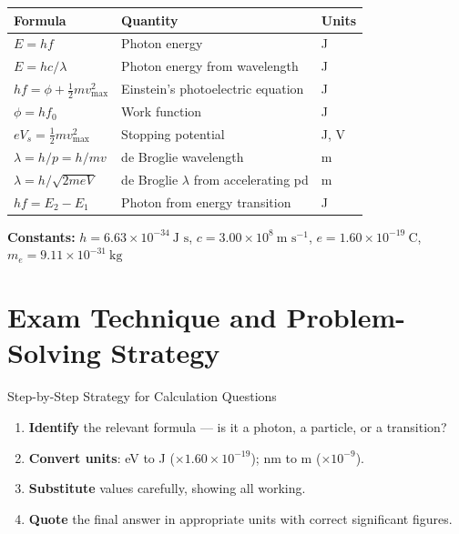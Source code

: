 \begin{minipage}{\linewidth}
\begin{tcolorbox}[colback=lightgold, colframe=accentgold]
\renewcommand{\arraystretch}{1.8}
\begin{tabular}{@{}lll@{}}
\toprule
\textbf{Formula} & \textbf{Quantity} & \textbf{Units} \\
\midrule
$E = hf$ & Photon energy & J \\
$E = hc/\lambda$ & Photon energy from wavelength & J \\
$hf = \phi + \tfrac{1}{2}mv^2_{\max}$ & Einstein's photoelectric equation & J \\
$\phi = hf_0$ & Work function & J \\
$eV_s = \tfrac{1}{2}mv^2_{\max}$ & Stopping potential & J, V \\
$\lambda = h/p = h/mv$ & de Broglie wavelength & m \\
$\lambda = h/\!\sqrt{2meV}$ & de Broglie $\lambda$ from accelerating pd & m \\
$hf = E_2 - E_1$ & Photon from energy transition & J \\
\bottomrule
\end{tabular}
\end{tcolorbox}

\vspace{0.5em}
\begin{tcolorbox}[colback=lightblue, colframe=darkblue]
\textbf{Constants:}\quad
$h = 6.63\times10^{-34}\ \text{J s}$,\quad
$c = 3.00\times10^{8}\ \text{m s}^{-1}$,\quad
$e = 1.60\times10^{-19}\ \text{C}$,\quad
$m_e = 9.11\times10^{-31}\ \text{kg}$
\end{tcolorbox}
\end{minipage}

\section{Exam Technique and Problem-Solving Strategy}

\begin{keybox}{Step-by-Step Strategy for Calculation Questions}
\begin{enumerate}[itemsep=3pt]
  \item \textbf{Identify} the relevant formula — is it a photon, a particle, or a transition?
  \item \textbf{Convert units}: eV to J ($\times 1.60\times10^{-19}$); nm to m ($\times 10^{-9}$).
  \item \textbf{Substitute} values carefully, showing all working.
  \item \textbf{Quote} the final answer in appropriate units with correct significant figures.
\end{enumerate}
\end{keybox}

